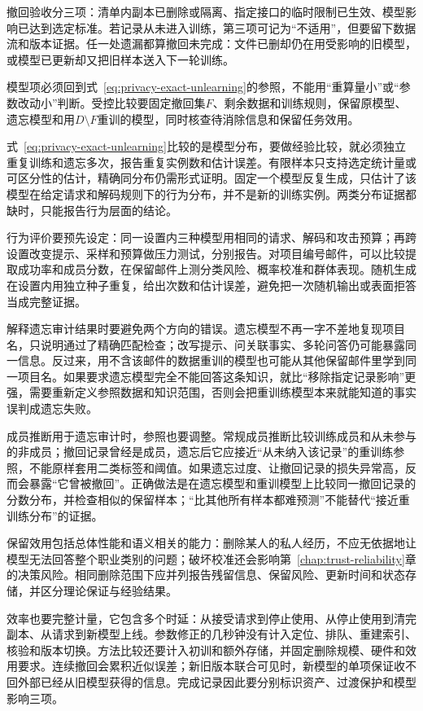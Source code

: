 撤回验收分三项：清单内副本已删除或隔离、指定接口的临时限制已生效、模型影响已达到选定标准。若记录从未进入训练，第三项可记为“不适用”，但要留下数据流和版本证据。任一处遗漏都算撤回未完成：文件已删却仍在用受影响的旧模型，或模型已更新却又把旧样本送入下一轮训练。

模型项必须回到式~\eqref{eq:privacy-exact-unlearning}的参照，不能用“重算量小”或“参数改动小”判断。受控比较要固定撤回集$F$、剩余数据和训练规则，保留原模型、遗忘模型和用$D\setminus F$重训的模型，同时核查待消除信息和保留任务效用。

式~\eqref{eq:privacy-exact-unlearning}比较的是模型分布，要做经验比较，就必须独立重复训练和遗忘多次，报告重复实例数和估计误差。有限样本只支持选定统计量或可区分性的估计，精确同分布仍需形式证明。固定一个模型反复生成，只估计了该模型在给定请求和解码规则下的行为分布，并不是新的训练实例。两类分布证据都缺时，只能报告行为层面的结论。

行为评价要预先设定：同一设置内三种模型用相同的请求、解码和攻击预算；再跨设置改变提示、采样和预算做压力测试，分别报告。对项目编号邮件，可以比较提取成功率和成员分数，在保留邮件上测分类风险、概率校准和群体表现。随机生成在设置内用独立种子重复，给出次数和估计误差，避免把一次随机输出或表面拒答当成完整证据。

解释遗忘审计结果时要避免两个方向的错误。遗忘模型不再一字不差地复现项目名，只说明通过了精确匹配检查；改写提示、问关联事实、多轮问答仍可能暴露同一信息。反过来，用不含该邮件的数据重训的模型也可能从其他保留邮件里学到同一项目名。如果要求遗忘模型完全不能回答这条知识，就比“移除指定记录影响”更强，需要重新定义参照数据和知识范围，否则会把重训练模型本来就能知道的事实误判成遗忘失败。

成员推断用于遗忘审计时，参照也要调整。常规成员推断比较训练成员和从未参与的非成员；撤回记录曾经是成员，遗忘后它应接近“从未纳入该记录”的重训练参照，不能原样套用二类标签和阈值。如果遗忘过度、让撤回记录的损失异常高，反而会暴露“它曾被撤回”。正确做法是在遗忘模型和重训模型上比较同一撤回记录的分数分布，并检查相似的保留样本；“比其他所有样本都难预测”不能替代“接近重训练分布”的证据。

保留效用包括总体性能和语义相关的能力：删除某人的私人经历，不应无依据地让模型无法回答整个职业类别的问题；破坏校准还会影响第~\ref{chap:trust-reliability}章的决策风险。相同删除范围下应并列报告残留信息、保留风险、更新时间和状态存储，并区分理论保证与经验结果。

效率也要完整计量，它包含多个时延：从接受请求到停止使用、从停止使用到清完副本、从请求到新模型上线。参数修正的几秒钟没有计入定位、排队、重建索引、核验和版本切换。方法比较还要计入初训和额外存储，并固定删除规模、硬件和效用要求。连续撤回会累积近似误差；新旧版本联合可见时，新模型的单项保证收不回外部已经从旧模型获得的信息。完成记录因此要分别标识资产、过渡保护和模型影响三项。


